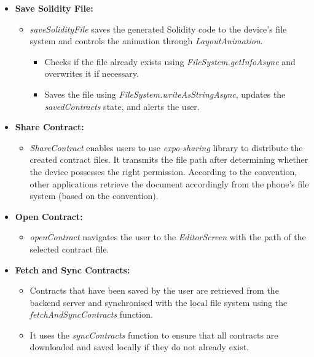 \begin{itemize}
    \item \textbf{Save Solidity File:}
    \begin{itemize}
        \item \textit{saveSolidityFile} saves the generated Solidity code to the device's file system and controls the animation through \textit{LayoutAnimation}.
        \begin{itemize}
            \item Checks if the file already exists using \textit{FileSystem.getInfoAsync} and overwrites it if necessary.
            \item Saves the file using \textit{FileSystem.writeAsStringAsync}, updates the \textit{savedContracts} state, and alerts the user.
        \end{itemize}
    \end{itemize}

    \item \textbf{Share Contract:}
    \begin{itemize}
        \item \textit{ShareContract} enables users to use \textit{expo-sharing} library to distribute the created contract files. It transmits the file path after determining whether the device possesses the right permission. According to the convention, other applications retrieve the document accordingly from the phone's file system (based on the convention).
    \end{itemize}

    \item \textbf{Open Contract:}
    \begin{itemize}
        \item \textit{openContract} navigates the user to the \textit{EditorScreen} with the path of the selected contract file.
    \end{itemize}

    \item \textbf{Fetch and Sync Contracts:}
    \begin{itemize}
        \item Contracts that have been saved by the user are retrieved from the backend server and synchronised with the local file system using the \textit{fetchAndSyncContracts} function.
        \item It uses the \textit{syncContracts} function to ensure that all contracts are downloaded and saved locally if they do not already exist.
    \end{itemize}


\end{itemize}
